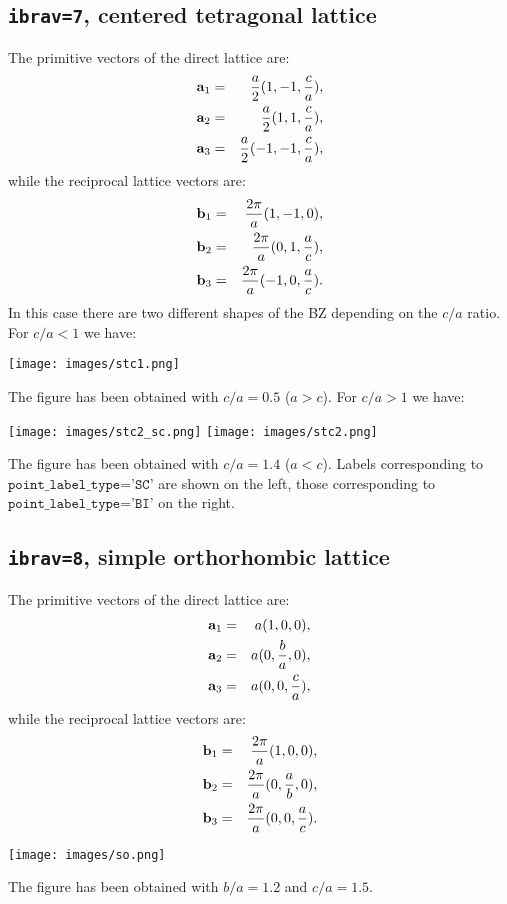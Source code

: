 \documentclass[12pt,a4paper]{article}
\begin{document}
\subsection{\texttt{ibrav=7}, centered tetragonal lattice}
The primitive vectors of the direct lattice are:
\begin{eqnarray}
{\bf a}_1 &=& {a \over 2} (1, -1, {c\over a}), \nonumber \\
{\bf a}_2 &=& {a \over 2} (1, 1, {c\over a}), \nonumber \\
{\bf a}_3 &=& {a \over 2} (-1, -1, {c\over a}), \nonumber
\nonumber
\end{eqnarray}
while the reciprocal lattice vectors are:
\begin{eqnarray}
{\bf b}_1 &=& {2\pi \over a} (1, -1, 0), \nonumber \\
{\bf b}_2 &=& {2\pi \over a} (0, 1, {a\over c}), \nonumber \\
{\bf b}_3 &=& {2\pi \over a} (-1, 0, {a\over c}). \nonumber
\nonumber
\end{eqnarray}
In this case there are two different shapes of the BZ depending on the
$c/a$ ratio. For $c/a<1$ we have:
\begin{center}
\texttt{[image: images/stc1.png]}
\end{center}
The figure has been obtained with $c/a=0.5$ ($a>c$). For $c/a>1$ we have:
\begin{center}
\texttt{[image: images/stc2\_sc.png]} \hspace{1cm}
\texttt{[image: images/stc2.png]}
\end{center}
The figure has been obtained with $c/a=1.4$ ($a<c$).
Labels corresponding to $\texttt{point\_label\_type='SC'}$ are shown on the left,
those corresponding to $\texttt{point\_label\_type='BI'}$ on the right.

\subsection{\texttt{ibrav=8}, simple orthorhombic lattice}
The primitive vectors of the direct lattice are:
\begin{eqnarray}
{\bf a}_1 &=& a (1, 0, 0), \nonumber \\
{\bf a}_2 &=& a (0, {b\over a}, 0), \nonumber \\
{\bf a}_3 &=& a (0, 0, {c\over a}), \nonumber
\nonumber
\end{eqnarray}
while the reciprocal lattice vectors are:
\begin{eqnarray}
{\bf b}_1 &=& {2\pi \over a} (1, 0, 0), \nonumber \\
{\bf b}_2 &=& {2\pi \over a} (0, {a\over b}, 0), \nonumber \\
{\bf b}_3 &=& {2\pi \over a} (0, 0, {a\over c}). \nonumber
\nonumber
\end{eqnarray}
\begin{center}
\texttt{[image: images/so.png]}
\end{center}
The figure has been obtained with $b/a=1.2$ and $c/a=1.5$.
\end{document}
